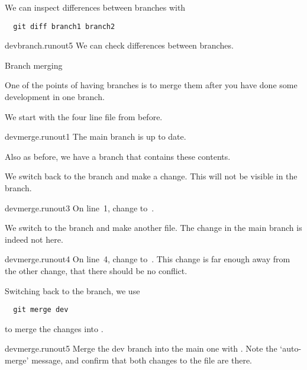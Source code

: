 We can inspect differences between branches with 
\begin{lstlisting}
  git diff branch1 branch2
\end{lstlisting}

\begin{gitstep}{devbranch.runout5}
  We can check differences between branches.
\end{gitstep}

 {Branch merging}
\label{sec:git-branch-merge}

One of the points of having branches is to merge
them after you have done some development in one branch.

We start with the four line file from before.

\begin{gitstep}{devmerge.runout1}
  The main branch is up to date.
\end{gitstep}

Also as before, we have a  branch that contains
these contents.


We switch back to the  branch and make a change.
This will not be visible in the  branch.

\begin{gitstep}{devmerge.runout3}
  On line~1, change  to~.
\end{gitstep}

We switch to the  branch and make another file.
The change in the main branch is indeed not here.

\begin{gitstep}{devmerge.runout4}
  On line~4, change  to~.
  This change is far enough away from the other change,
  that there should be no conflict.
\end{gitstep}

Switching back to the  branch, we use
\begin{lstlisting}
  git merge dev
\end{lstlisting}
to merge the  changes into .

\begin{gitstep}{devmerge.runout5}
  Merge the dev branch into the main one with .
  Note the `auto-merge' message,
  and confirm that both changes to the file are there.
\end{gitstep}

